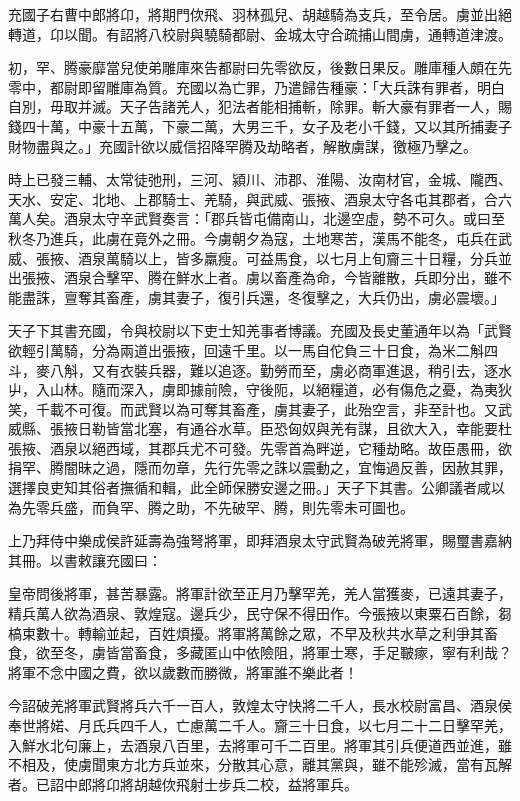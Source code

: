 \begin{pinyinscope}
充國子右曹中郎將卬，將期門佽飛、羽林孤兒、胡越騎為支兵，至令居。虜並出絕轉道，卬以聞。有詔將八校尉與驍騎都尉、金城太守合疏捕山間虜，通轉道津渡。

初，罕、腾豪靡當兒使弟雕庫來告都尉曰先零欲反，後數日果反。雕庫種人頗在先零中，都尉即留雕庫為質。充國以為亡罪，乃遣歸告種豪：「大兵誅有罪者，明白自別，毋取并滅。天子告諸羌人，犯法者能相捕斬，除罪。斬大豪有罪者一人，賜錢四十萬，中豪十五萬，下豪二萬，大男三千，女子及老小千錢，又以其所捕妻子財物盡與之。」充國計欲以威信招降罕腾及劫略者，解散虜謀，徼極乃擊之。

時上已發三輔、太常徒弛刑，三河、潁川、沛郡、淮陽、汝南材官，金城、隴西、天水、安定、北地、上郡騎士、羌騎，與武威、張掖、酒泉太守各屯其郡者，合六萬人矣。酒泉太守辛武賢奏言：「郡兵皆屯備南山，北邊空虛，勢不可久。或曰至秋冬乃進兵，此虜在竟外之冊。今虜朝夕為寇，土地寒苦，漢馬不能冬，屯兵在武威、張掖、酒泉萬騎以上，皆多羸瘦。可益馬食，以七月上旬齎三十日糧，分兵並出張掖、酒泉合擊罕、腾在鮮水上者。虜以畜產為命，今皆離散，兵即分出，雖不能盡誅，亶奪其畜產，虜其妻子，復引兵還，冬復擊之，大兵仍出，虜必震壞。」

天子下其書充國，令與校尉以下吏士知羌事者博議。充國及長史董通年以為「武賢欲輕引萬騎，分為兩道出張掖，回遠千里。以一馬自佗負三十日食，為米二斛四斗，麥八斛，又有衣裝兵器，難以追逐。勤勞而至，虜必商軍進退，稍引去，逐水屮，入山林。隨而深入，虜即據前險，守後阨，以絕糧道，必有傷危之憂，為夷狄笑，千載不可復。而武賢以為可奪其畜產，虜其妻子，此殆空言，非至計也。又武威縣、張掖日勒皆當北塞，有通谷水草。臣恐匈奴與羌有謀，且欲大入，幸能要杜張掖、酒泉以絕西域，其郡兵尤不可發。先零首為畔逆，它種劫略。故臣愚冊，欲捐罕、腾闇昧之過，隱而勿章，先行先零之誅以震動之，宜悔過反善，因赦其罪，選擇良吏知其俗者撫循和輯，此全師保勝安邊之冊。」天子下其書。公卿議者咸以為先零兵盛，而負罕、腾之助，不先破罕、腾，則先零未可圖也。

上乃拜侍中樂成侯許延壽為強弩將軍，即拜酒泉太守武賢為破羌將軍，賜璽書嘉納其冊。以書敕讓充國曰：

皇帝問後將軍，甚苦暴露。將軍計欲至正月乃擊罕羌，羌人當獲麥，已遠其妻子，精兵萬人欲為酒泉、敦煌寇。邊兵少，民守保不得田作。今張掖以東粟石百餘，芻槁束數十。轉輸並起，百姓煩擾。將軍將萬餘之眾，不早及秋共水草之利爭其畜食，欲至冬，虜皆當畜食，多藏匿山中依險阻，將軍士寒，手足皸瘃，寧有利哉？將軍不念中國之費，欲以歲數而勝微，將軍誰不樂此者！

今詔破羌將軍武賢將兵六千一百人，敦煌太守快將二千人，長水校尉富昌、酒泉侯奉世將婼、月氏兵四千人，亡慮萬二千人。齎三十日食，以七月二十二日擊罕羌，入鮮水北句廉上，去酒泉八百里，去將軍可千二百里。將軍其引兵便道西並進，雖不相及，使虜聞東方北方兵並來，分散其心意，離其黨與，雖不能殄滅，當有瓦解者。已詔中郎將卬將胡越佽飛射士步兵二校，益將軍兵。


\end{pinyinscope}
